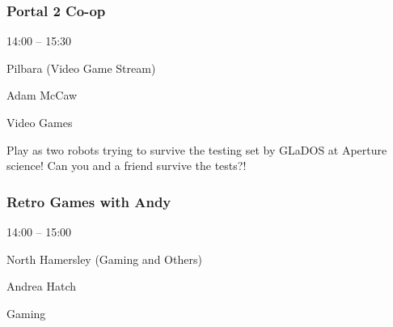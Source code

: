 \documentclass{scrreprt}
\begin{document}
\begin{multicols}{2}
\subsubsection*{Portal 2 Co-op}\begin{description}
\setlength{\itemsep}{0pt}
\setlength{\parsep}{0pt}
\setlength{\parskip}{0pt}
\item[Time:]{14:00 -- 15:30}
\item[Venue:]{Pilbara (Video Game Stream)}
\item[People:]{Adam McCaw}
\item[Tags:]{Video Games}\end{description}
Play as two robots trying to survive the testing set by GLaDOS at Aperture science! Can you and a friend survive the tests?!
\subsubsection*{Retro Games with Andy}\begin{description}
\setlength{\itemsep}{0pt}
\setlength{\parsep}{0pt}
\setlength{\parskip}{0pt}
\item[Time:]{14:00 -- 15:00}
\item[Venue:]{North Hamersley (Gaming and Others)}
\item[People:]{Andrea Hatch}
\item[Tags:]{Gaming}\end{description}


\end{multicols}
\end{document}
